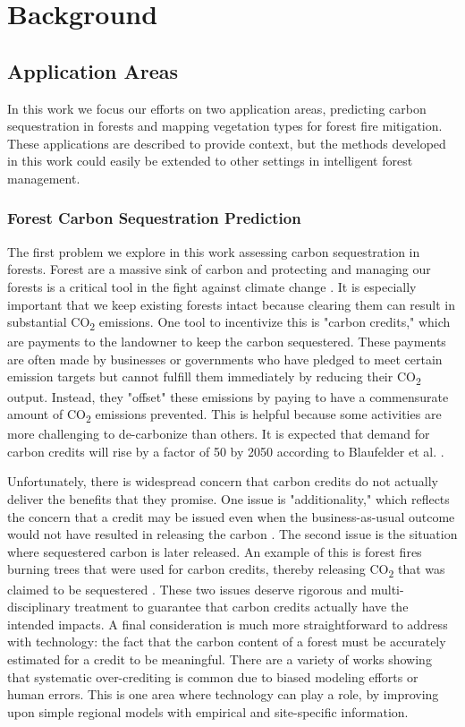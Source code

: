 \chapter{Background} \label{chapBackground}
\section{Application Areas}
In this work we focus our efforts on two application areas, predicting carbon sequestration in forests and mapping vegetation types for forest fire mitigation. These applications are described to provide context, but the methods developed in this work could easily be extended to other settings in intelligent forest management.
\subsection{Forest Carbon Sequestration Prediction}
The first problem we explore in this work assessing carbon sequestration in forests. Forest are a massive sink of carbon and protecting and managing our forests is a critical tool in the fight against climate change \cite{Griscom2017NaturalSolutions}. 
It is especially important that we keep existing forests intact because clearing them can result in substantial CO\textsubscript{2} emissions. 
One tool to incentivize this is "carbon credits," which are payments to the landowner to keep the carbon sequestered. These payments are often made by businesses or governments who have pledged to meet certain emission targets but cannot fulfill them immediately by reducing their CO\textsubscript{2} output. Instead, they "offset" these emissions by paying to have a commensurate amount of CO\textsubscript{2} emissions prevented. This is helpful because some activities are more challenging to de-carbonize than others. 
It is expected that demand for carbon credits will rise by a factor of 50 by 2050 according to Blaufelder et al. \cite{Blaufelder2021AChallenge}. 

Unfortunately, there is widespread concern that carbon credits do not actually deliver the benefits that they promise. One issue is "additionality," which reflects the concern that a credit may be issued even when the business-as-usual outcome would not have resulted in releasing the carbon \cite{Gillenwater2011TheProgramme}.
The second issue is the situation where sequestered carbon is later released. An example of this is forest fires burning trees that were used for carbon credits, thereby releasing CO\textsubscript{2} that was claimed to be sequestered \cite{Kaplan2023AccountingMarkets}. These two issues deserve rigorous and multi-disciplinary treatment to guarantee that carbon credits actually have the intended impacts. A final consideration is much more straightforward to address with technology: the fact that the carbon content of a forest must be accurately estimated for a credit to be meaningful. There are a variety of works showing that systematic over-crediting is common \cite{Badgley2022SystematicProgram,West2020OverstatedAmazon} due to biased modeling efforts or human errors. This is one area where technology can play a role, by improving upon simple regional models with empirical and site-specific information. 

